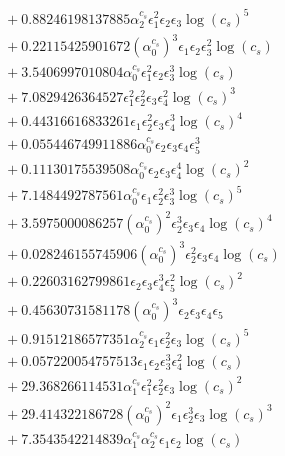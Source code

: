 \documentclass[10pt]{article}
\begin{document}
\begin{align*}
&{}  + 0.88246198137885 \alpha_{2}^{c_s} \epsilon_{1}^{2} \epsilon_{2} \epsilon_{3} \log{\left(c_{s} \right)}^{5} \\
&{}  + 0.22115425901672 \left(\alpha_{0}^{c_s}\right)^{3} \epsilon_{1} \epsilon_{2} \epsilon_{3}^{2} \log{\left(c_{s} \right)} \\
&{}  + 3.5406997010804 \alpha_{0}^{c_s} \epsilon_{1}^{2} \epsilon_{2} \epsilon_{3}^{3} \log{\left(c_{s} \right)} \\
&{}  + 7.0829426364527 \epsilon_{1}^{2} \epsilon_{2}^{2} \epsilon_{3} \epsilon_{4}^{2} \log{\left(c_{s} \right)}^{3} \\
&{}  + 0.44316616833261 \epsilon_{1} \epsilon_{2}^{2} \epsilon_{3} \epsilon_{4}^{3} \log{\left(c_{s} \right)}^{4} \\
&{}  + 0.055446749911886 \alpha_{0}^{c_s} \epsilon_{2} \epsilon_{3} \epsilon_{4} \epsilon_{5}^{3} \\
&{}  + 0.11130175539508 \alpha_{0}^{c_s} \epsilon_{2} \epsilon_{3} \epsilon_{4}^{4} \log{\left(c_{s} \right)}^{2} \\
&{}  + 7.1484492787561 \alpha_{0}^{c_s} \epsilon_{1} \epsilon_{2}^{2} \epsilon_{3}^{3} \log{\left(c_{s} \right)}^{5} \\
&{}  + 3.5975000086257 \left(\alpha_{0}^{c_s}\right)^{2} \epsilon_{2}^{3} \epsilon_{3} \epsilon_{4} \log{\left(c_{s} \right)}^{4} \\
&{}  + 0.028246155745906 \left(\alpha_{0}^{c_s}\right)^{3} \epsilon_{2}^{2} \epsilon_{3} \epsilon_{4} \log{\left(c_{s} \right)} \\
&{}  + 0.22603162799861 \epsilon_{2} \epsilon_{3} \epsilon_{4}^{3} \epsilon_{5}^{2} \log{\left(c_{s} \right)}^{2} \\
&{}  + 0.45630731581178 \left(\alpha_{0}^{c_s}\right)^{3} \epsilon_{2} \epsilon_{3} \epsilon_{4} \epsilon_{5} \\
&{}  + 0.91512186577351 \alpha_{2}^{c_s} \epsilon_{1} \epsilon_{2}^{2} \epsilon_{3} \log{\left(c_{s} \right)}^{5} \\
&{}  + 0.057220054757513 \epsilon_{1} \epsilon_{2} \epsilon_{3}^{3} \epsilon_{4}^{2} \log{\left(c_{s} \right)} \\
&{}  + 29.368266114531 \alpha_{1}^{c_s} \epsilon_{1}^{2} \epsilon_{2}^{2} \epsilon_{3} \log{\left(c_{s} \right)}^{2} \\
&{}  + 29.414322186728 \left(\alpha_{0}^{c_s}\right)^{2} \epsilon_{1} \epsilon_{2}^{3} \epsilon_{3} \log{\left(c_{s} \right)}^{3} \\
&{}  + 7.3543542214839 \alpha_{1}^{c_s} \alpha_{2}^{c_s} \epsilon_{1} \epsilon_{2} \log{\left(c_{s} \right)} \\

\end{align*}
\end{document}
